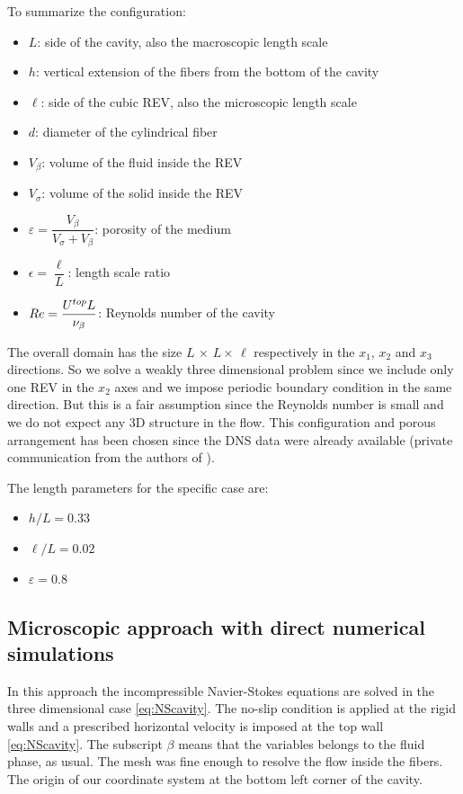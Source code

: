 To summarize the configuration:
\begin{itemize}
	\item $L$: side of the cavity, also the macroscopic length scale
	\item $h$: vertical extension of the fibers from the bottom of the cavity 
	\item $\ell$: side of the cubic REV, also the microscopic length scale
	\item $d$: diameter of the cylindrical fiber
	\item $V_{\beta}$: volume of the fluid inside the REV
	\item $V_{\sigma}$: volume of the solid inside the REV
	\item $\varepsilon = \dfrac{V_{\beta}}{V_{\sigma} +V_{\beta}}$: porosity of the medium
	\item $\epsilon = \dfrac{\ell}{L}$: length scale ratio
	\item $Re= \dfrac{U^{top} L}{\nu_{\beta}}$: Reynolds number of the cavity
\end{itemize}

The overall domain has the size $L \, \times \, L \times \, \ell$ respectively in the $x_1$, $x_2$ and $x_3$ directions.
So we solve a weakly three dimensional problem since we include only one REV in the $x_2$ axes and we impose periodic boundary condition in the same direction.
But this is a fair assumption since the Reynolds number is small and we do not expect any 3D structure in the flow.
This configuration and porous arrangement has been chosen since the DNS data were already available (private communication from the authors of \citet{zampogna2016fluid}).

The length parameters for the specific case are:
\begin{itemize}
	\item $h/L=0.33$
	\item $\ell/L=0.02$
	\item $\varepsilon = 0.8$
\end{itemize}

\subsection{Microscopic approach with direct numerical simulations}

In this approach the incompressible Navier-Stokes equations are solved in the three dimensional case \eqref{eq:NScavity}. The no-slip condition is applied at the rigid walls and a prescribed horizontal velocity is imposed at the top wall \eqref{eq:NScavity}.
The subscript $\beta$ means that the variables belongs to the fluid phase, as usual. The mesh was fine enough to resolve the flow inside the fibers.
The origin of our coordinate system at the bottom left corner of the cavity. 

